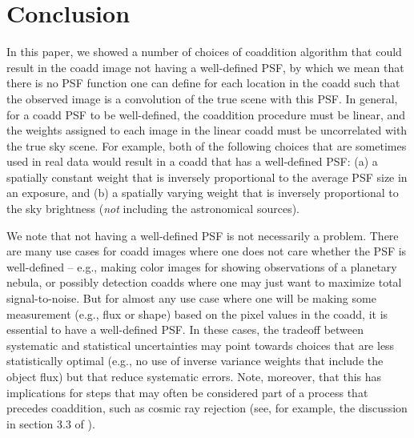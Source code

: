 \documentclass{aastex63}
\newcommand{\rachel}[1]{{\color{magenta}RM: #1}}
\newcommand{\mike}[1]{{\color{cyan}MJ: #1}}
\begin{document}
\section{Conclusion}

In this paper, we showed a number of choices of coaddition algorithm that could result
in the coadd image not having a well-defined PSF, by which we mean that there is no
PSF function one can define for each location in the coadd such that the observed image is a convolution
of the true scene with this PSF. In general, for a coadd PSF to be well-defined, the coaddition procedure must be linear, and the weights assigned to each image in the linear coadd must be uncorrelated with the true sky scene.  For example, both of the following choices that are sometimes used in real data would result in a coadd that has a well-defined PSF: (a) a spatially constant weight that is inversely proportional to the average PSF size in an exposure, and (b) a spatially varying weight that is inversely proportional to the sky brightness ({\em not} including the astronomical sources).  

We note that not having a well-defined PSF is not necessarily a problem.  There are many use cases for coadd images
where one does not care whether the PSF is well-defined -- e.g., making color images
for showing observations of a planetary nebula, or possibly detection coadds where one may just want to maximize total signal-to-noise.
But for almost any use case where one will
be making some measurement (e.g., flux or shape) based on the pixel values in the coadd,
it is essential to have a well-defined PSF.  In these cases, the tradeoff between systematic and statistical uncertainties may point towards choices that are less statistically optimal (e.g., no use of inverse variance weights that include the object flux) but that reduce systematic errors.  Note, moreover, that this has implications for steps that may often be considered part of a process that precedes coaddition, such as cosmic ray rejection (see, for example, the discussion in section 3.3 of \citealt{2018PASJ...70S...5B}).
\end{document}
